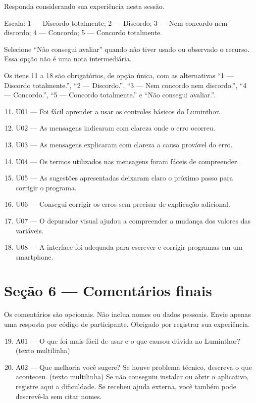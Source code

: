 Responda considerando sua experiência nesta sessão.

Escala: 1 --- Discordo totalmente; 2 --- Discordo; 3 --- Nem concordo nem discordo;
4 --- Concordo; 5 --- Concordo totalmente.

Selecione ``Não consegui avaliar'' quando não tiver usado ou observado o recurso.
Essa opção não é uma nota intermediária.

Os itens 11 a 18 são obrigatórios, de opção única, com as alternativas
``1 --- Discordo totalmente.'', ``2 --- Discordo.'', ``3 --- Nem concordo nem
discordo.'', ``4 --- Concordo.'', ``5 --- Concordo totalmente.'' e ``Não consegui
avaliar.''.

\begin{enumerate}
\setcounter{enumi}{10}
\item U01 --- Foi fácil aprender a usar os controles básicos do Luminthor.
\item U02 --- As mensagens indicaram com clareza onde o erro ocorreu.
\item U03 --- As mensagens explicaram com clareza a causa provável do erro.
\item U04 --- Os termos utilizados nas mensagens foram fáceis de compreender.
\item U05 --- As sugestões apresentadas deixaram claro o próximo passo para corrigir o programa.
\item U06 --- Consegui corrigir os erros sem precisar de explicação adicional.
\item U07 --- O depurador visual ajudou a compreender a mudança dos valores das variáveis.
\item U08 --- A interface foi adequada para escrever e corrigir programas em um smartphone.
\end{enumerate}

\section*{Seção 6 --- Comentários finais}

Os comentários são opcionais. Não inclua nomes ou dados pessoais. Envie apenas uma
resposta por código de participante. Obrigado por registrar sua experiência.

\begin{enumerate}
\setcounter{enumi}{18}
\item A01 --- O que foi mais fácil de usar e o que causou dúvida no Luminthor?
  (texto multilinha)
\item A02 --- Que melhoria você sugere? Se houve problema técnico, descreva o que
  aconteceu. (texto multilinha) Se não conseguiu instalar ou abrir o aplicativo,
  registre aqui a dificuldade. Se recebeu ajuda externa, você também pode
  descrevê-la sem citar nomes.
\end{enumerate}


